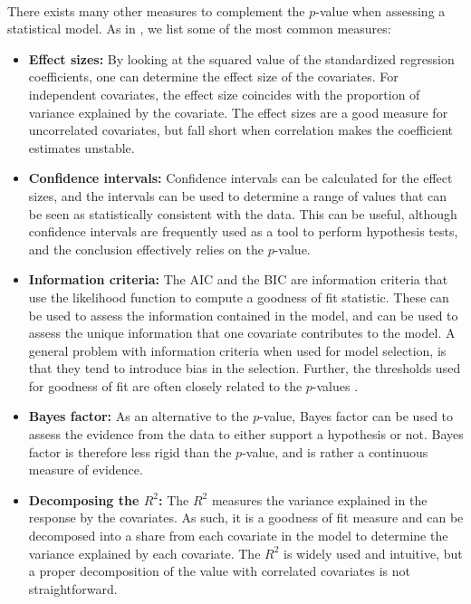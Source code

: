 \\
There exists many other measures to complement the $p$-value when assessing a statistical model. As in \citet{Arnstad:Relative_variable_importance_in_Bayesian_linear_mixed_models:2024}, we list some of the most common measures:
\begin{itemize}
    \item \textbf{Effect sizes:} By looking at the squared value of the standardized regression coefficients, one can determine the effect size of the covariates. For independent covariates, the effect size coincides with the proportion of variance explained by the covariate. The effect sizes are a good measure for uncorrelated covariates, but fall short when correlation makes the coefficient estimates unstable.
    \item \textbf{Confidence intervals:} Confidence intervals can be calculated for the effect sizes, and the intervals can be used to determine a range of values that can be seen as statistically consistent with the data. This can be useful, although confidence intervals are frequently used as a tool to perform hypothesis tests, and the conclusion effectively relies on the $p$-value.
    \item \textbf{Information criteria:} The AIC \citep{Akaike_AIC} and the BIC \citep{Schwarz_BIC} are information criteria that use the likelihood function to compute a goodness of fit statistic. These can be used to assess the information contained in the model, and can be used to assess the unique information that one covariate contributes to the model. A general problem with information criteria when used for model selection, is that they tend to introduce bias in the selection. Further, the thresholds used for goodness of fit are often closely related to the $p$-values \citep{Murtaugh2014}. 
    \item \textbf{Bayes factor:} As an alternative to the $p$-value, Bayes factor can be used to assess the evidence from the data to either support a hypothesis or not. Bayes factor is therefore less rigid than the $p$-value, and is rather a continuous measure of evidence.
    \item \textbf{Decomposing the $R^2$:} The $R^2$ measures the variance explained in the response by the covariates. As such, it is a goodness of fit measure and can be decomposed into a share from each covariate in the model to determine the variance explained by each covariate. The $R^2$ is widely used and intuitive, but a proper decomposition of the value with correlated covariates is not straightforward.
\end{itemize}
